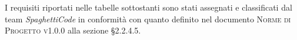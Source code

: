 \documentclass[../analisi_dei_requisiti.tex]{subfiles}
\begin{document}
I requisiti riportati nelle tabelle sottostanti sono stati assegnati e classificati dal team \emph{SpaghettiCode} in conformità con quanto definito 
nel documento \textsc{Norme di Progetto v1.0.0} alla sezione \S2.2.4.5.



\newpage



\newpage



\newpage



\newpage



\newpage



\newpage


\end{document}
